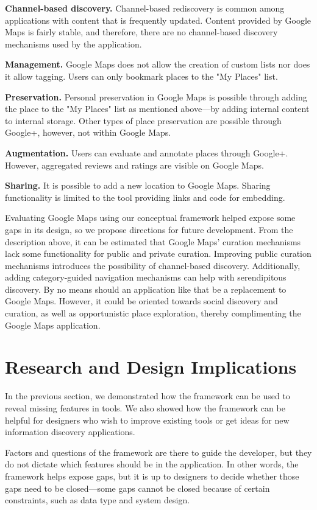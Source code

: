 \documentclass{casconpaper}
\begin{document}
{{\textbf{Channel-based discovery.} Channel-based rediscovery is common among applications with content that is frequently updated. Content provided by Google Maps is fairly stable, and therefore, there are no channel-based discovery mechanisms used by the application.

\textbf{Management.} Google Maps does not allow the creation of custom lists nor does it allow tagging. Users can only bookmark places to the "My Places" list. 

\textbf{Preservation.} Personal preservation in Google Maps is possible through adding the place to the "My Places" list as mentioned above---by adding internal content to internal storage. Other types of place preservation are possible through Google+, however, not within Google Maps.

\textbf{Augmentation.} Users can evaluate and annotate places through Google+. However, aggregated reviews and ratings are visible on Google Maps. 

\textbf{Sharing.} It is possible to add a new location to Google Maps. Sharing functionality is limited to the tool providing links and code for embedding.  

Evaluating Google Maps using our conceptual framework helped expose some gaps in its design, so we propose directions for future development. From the description above, it can be estimated that Google Maps' curation mechanisms lack some functionality for public and private curation. Improving public curation mechanisms introduces the possibility of channel-based discovery. Additionally, adding category-guided navigation mechanisms can help with serendipitous discovery. By no means should an application like that be a replacement to Google Maps. However, it could be oriented towards social discovery and curation, as well as opportunistic place exploration, thereby complimenting the Google Maps application.  

} %

{\section{Research and Design Implications}
In the previous section, we demonstrated how the framework can be used to reveal missing features in tools. We also showed how the framework can be helpful for designers who wish to improve existing tools or get ideas for new information discovery applications. 

Factors and questions of the framework are there to guide the developer, but they do not dictate which features should be in the application. In other words, the framework helps expose gaps, but it is up to designers to decide whether those gaps need to be closed---some gaps cannot be closed because of certain constraints, such as data type and system design.

}}
\end{document}
